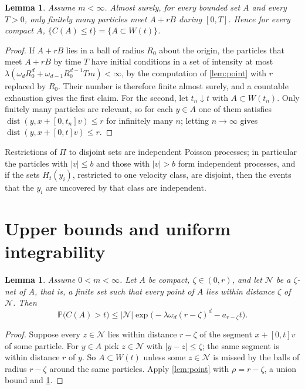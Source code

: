 \documentclass[11pt,a4paper]{article}
\numberwithin{equation}{section}
\newtheorem{lemma}[theorem]{Lemma}
\theoremstyle{definition}
\theoremstyle{remark}
\newcommand{\Pp}{\mathbb P}
\newcommand{\abs}[1]{\lvert#1\rvert}
\begin{document}
\begin{lemma}\label{lem:finite}
Assume $m<\infty$. Almost surely, for every bounded set $A$ and every $T>0$,
only finitely many particles meet $A+rB$ during $[0,T]$. Hence for every
compact $A$, $\{C(A)\le t\}=\{A\subset W(t)\}$.
\end{lemma}

\begin{proof}
If $A+rB$ lies in a ball of radius $R_0$ about the origin, the particles that
meet $A+rB$ by time $T$ have initial conditions in a set of intensity at most
$\lambda(\omega_dR_0^d+\omega_{d-1}R_0^{d-1}Tm)<\infty$, by the computation of
\cref{lem:point} with $r$ replaced by $R_0$. Their number is therefore finite
almost surely, and a countable exhaustion gives the first claim. For the
second, let $t_n\downarrow t$ with $A\subset W(t_n)$. Only finitely many
particles are relevant, so for each $y\in A$ one of them satisfies
$\operatorname{dist}(y,x+[0,t_n]v)\le r$ for infinitely many $n$; letting
$n\to\infty$ gives $\operatorname{dist}(y,x+[0,t]v)\le r$.
\end{proof}

Restrictions of $\Pi$ to disjoint sets are independent Poisson processes; in particular the particles
with $\abs v\le b$ and those with $\abs v>b$ form independent processes, and
if the sets $H_t(y_i)$, restricted to one velocity class, are disjoint, then
the events that the $y_i$ are uncovered by that class are independent.

\section{Upper bounds and uniform integrability}\label{sec:upper}

\begin{lemma}\label{lem:net}
Assume $0<m<\infty$. Let $A$ be compact, $\zeta\in(0,r)$, and let $\mathcal N$
be a $\zeta$-net of $A$, that is, a finite set such that every point of $A$
lies within distance $\zeta$ of $\mathcal N$. Then
\[
\Pp\bigl(C(A)>t\bigr)\le\abs{\mathcal N}\exp\bigl(-\lambda\omega_d(r-\zeta)^d-a_{r-\zeta}t\bigr).
\]
\end{lemma}

\begin{proof}
Suppose every $z\in\mathcal N$ lies within distance $r-\zeta$ of the segment
$x+[0,t]v$ of some particle. For $y\in A$ pick $z\in\mathcal N$ with
$\abs{y-z}\le\zeta$; the same segment is within distance $r$ of $y$. So
$A\subset W(t)$ unless some $z\in\mathcal N$ is missed by the balls of radius
$r-\zeta$ around the same particles. Apply \cref{lem:point} with
$\rho=r-\zeta$, a union bound and \cref{lem:finite}.
\end{proof}
\end{document}
